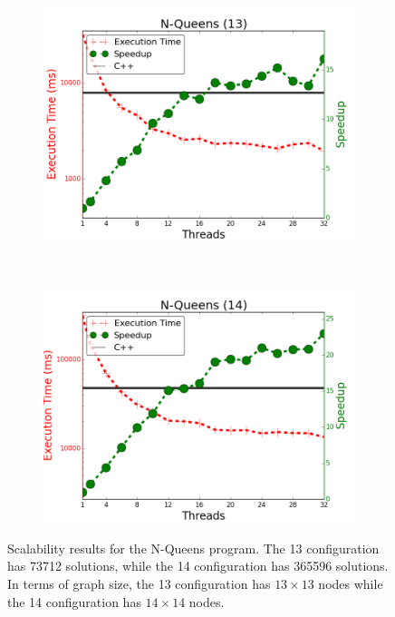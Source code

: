 \begin{figure}[]
        \centering
        \begin{subfigure}[b]{\plotsize\textwidth}
                \includegraphics[width=\textwidth]{experiments/scalability/scale-8queens-13.png}
                \label{fig:implementation:scale_queens13}
        \end{subfigure}
        ~
        \begin{subfigure}[b]{\plotsize\textwidth}
                \includegraphics[width=\textwidth]{experiments/scalability/scale-8queens-14.png}
                \label{fig:implementation:scale_queens14}
        \end{subfigure}

        \caption{Scalability results for the N-Queens program. The 13
        configuration has 73712 solutions, while the 14 configuration has 365596
     solutions. In terms of graph size, the 13 configuration has $13 \times 13$
  nodes while the 14 configuration has $14 \times 14$ nodes.}

        \label{fig:implementation:scale_queens}
\end{figure}

